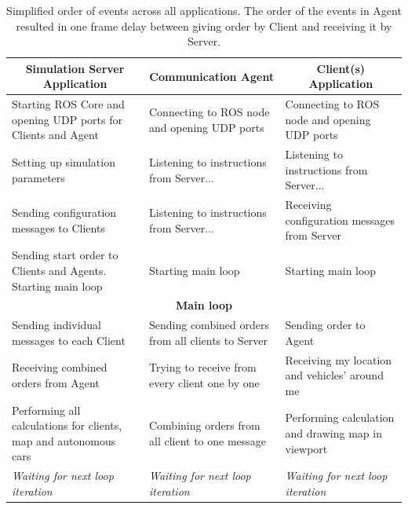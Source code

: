 \documentclass[11pt,english]{article}
\begin{document}
\begin{table}[]
\centering
\begin{tabular}{|m{4.4cm}|m{4.4cm}|m{4.4cm}|}
\hline
\multicolumn{1}{|c|}{\textbf{Simulation Server Application}}     & \multicolumn{1}{c|}{\textbf{Communication Agent}}  & \multicolumn{1}{c|}{\textbf{Client(s) Application}} \\ \hline
Starting ROS Core and opening UDP ports for Clients and Agent    & Connecting to ROS node and opening UDP ports       & Connecting to ROS node and opening UDP ports        \\ \hline
Setting up simulation parameters                                 & Listening to instructions from Server...           & Listening to instructions from Server...            \\ \hline
Sending configuration messages to Clients                       & Listening to instructions from Server...           & Receiving configuration messages from Server        \\ \hline
Sending start order to Clients and Agents. Starting main loop                       & Starting main loop                                 & Starting main loop                                  \\ \hline
\multicolumn{3}{|c|}{\textbf{Main loop}}                                                                                                                                    \\ \hline
Sending individual messages to each Client                       & Sending combined orders from all clients to Server & Sending order to Agent                              \\ \hline
Receiving combined orders from Agent                             & Trying to receive from every client one by one     & Receiving my location and vehicles' around me       \\ \hline
Performing all calculations for clients, map and autonomous cars & Combining orders from all client to one message    & Performing calculation and drawing map in viewport  \\ \hline
\textit{Waiting for next loop iteration}                         & \textit{Waiting for next loop iteration}           & \textit{Waiting for next loop iteration}            \\ \hline
\end{tabular}
\caption{Simplified order of events across all applications. The order of the events in Agent resulted in one frame delay between giving order by Client and receiving it by Server.}
\label{table:simple_events}
\end{table}
\end{document}
